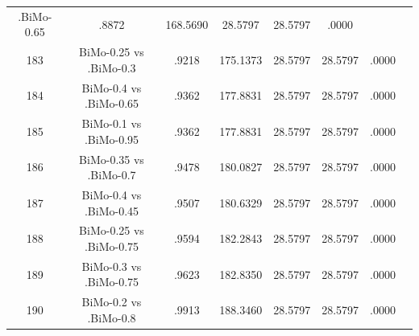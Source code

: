 \documentclass[a4paper,10pt]{article}
\begin{document}
\begin{landscape}
\begin{table}[!htp]
\begin{tabular}{cccccccc}
.BiMo-0.65&.8872&168.5690&28.5797&28.5797&.0000\\183&BiMo-0.25 vs .BiMo-0.3&.9218&175.1373&28.5797&28.5797&.0000\\184&BiMo-0.4 vs .BiMo-0.65&.9362&177.8831&28.5797&28.5797&.0000\\185&BiMo-0.1 vs .BiMo-0.95&.9362&177.8831&28.5797&28.5797&.0000\\186&BiMo-0.35 vs .BiMo-0.7&.9478&180.0827&28.5797&28.5797&.0000\\187&BiMo-0.4 vs .BiMo-0.45&.9507&180.6329&28.5797&28.5797&.0000\\188&BiMo-0.25 vs .BiMo-0.75&.9594&182.2843&28.5797&28.5797&.0000\\189&BiMo-0.3 vs .BiMo-0.75&.9623&182.8350&28.5797&28.5797&.0000\\190&BiMo-0.2 vs .BiMo-0.8&.9913&188.3460&28.5797&28.5797&.0000\\\hline
\end{tabular}
\end{table}

\end{landscape}
\end{document}
